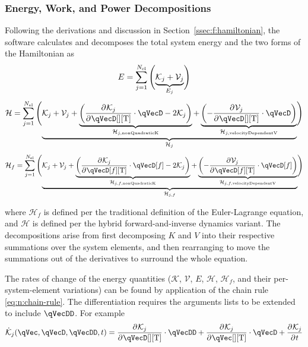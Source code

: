 \documentclass[11pt]{article}
\renewcommand{\secref}[1]{Section~\ref{#1}}
\newcommand{\pD}[2]{
    \frac{\partial\mspace{1mu}#1}{\partial\mspace{1mu}#2}
}
\begin{document}
\subsubsection{Energy, Work, and Power Decompositions} \label{sssec:d:decomposition:power}
Following the derivations and discussion in \secref{ssec:f:hamiltonian}, the software calculates and decomposes the total system energy and the two forms of the Hamiltonian as
\begin{equation}
    E = \sum_{j=1}^{N_\mathrm{el}}\del[4]{
        \underbrace{
            \mathcal{K}_j + \mathcal{V}_j
        }_{E_j}
    }
\end{equation}
\begin{equation}
    \mathcal{H}
    = \sum_{j=1}^{N_\mathrm{el}}\del[4]{
        \underbrace{
            \mathcal{K}_j + \mathcal{V}_j
            + \underbrace{\del{\pD{\mathcal{K}_j}{\qVecD[][\mathrm{T}]} \cdot \qVecD - 2\mathcal{K}_j}}_{\mathcal{H}_{j,\mathrm{nonQuadraticK}}}
            + \underbrace{\del{- \pD{\mathcal{V}_j}{\qVecD[][\mathrm{T}]} \cdot \qVecD}}_{\mathcal{H}_{j,\mathrm{velocityDependentV}}}
        }_{\mathcal{H}_j}
    }
\end{equation}
\begin{equation}
    \mathcal{H}_{f}
    = \sum_{j=1}^{N_\mathrm{el}}\del[4]{
        \underbrace{
            \mathcal{K}_j + \mathcal{V}_j
            + \underbrace{\del{\pD{\mathcal{K}_j}{\qVecD[f][\mathrm{T}]} \cdot \qVecD[f] - 2\mathcal{K}_j}}_{\mathcal{H}_{j,f,\mathrm{nonQuadraticK}}}
            + \underbrace{\del{- \pD{\mathcal{V}_j}{\qVecD[f][\mathrm{T}]} \cdot \qVecD[f]}}_{\mathcal{H}_{j,f,\mathrm{velocityDependentV}}}
        }_{\mathcal{H}_{j,f}}
    }
\end{equation}

where $\mathcal{H}_f$ is defined per the traditional definition of the Euler-Lagrange equation, and $\mathcal{H}$ is defined per the hybrid forward-and-inverse dynamics variant. The decompositions arise from first decomposing $K$ and $V$ into their respective summations over the system elements, and then rearranging to move the summations out of the derivatives to surround the whole equation.

The rates of change of the energy quantities ($\mathcal{K}$, $\mathcal{V}$, $E$, $\mathcal{H}$, $\mathcal{H}_f$, and their per-system-element variations) can be found by application of the chain rule \eqref{eq:n:chain-rule}. The differentiation requires the arguments lists to be extended to include $\qVecDD$. For example
\begin{equation} \label{eq:dTdt}
    \dot{\mathcal{K}}_j(\qVec, \qVecD, \qVecDD, t) =
    \pD{\mathcal{K}_j}{\qVecD[][\mathrm{T}]} \cdot \qVecDD
    + \pD{\mathcal{K}_j}{\qVec[][\mathrm{T}]} \cdot \qVecD
    + \pD{\mathcal{K}_j}{t}
\end{equation}
\end{document}
